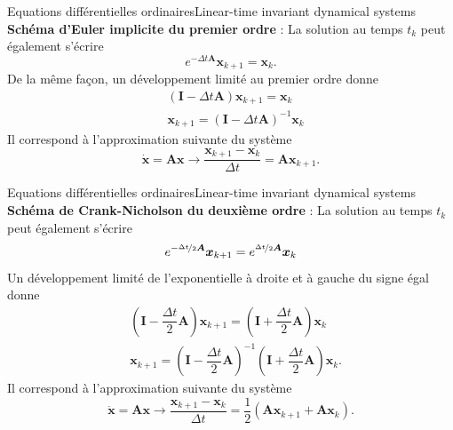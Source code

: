 \documentclass[usenames,dvipsnames,svgnames,10pt,aspectratio=169]{beamer}
\begin{document}
\begin{frame}[t, c]{Equations différentielles ordinaires}{Linear-time invariant dynamical systems}
  \alert{\textbf{Schéma d'Euler implicite du premier ordre}} : La solution au temps $t_k$ peut également s'écrire
    \[
    e^{-\Delta t \bm{A}} \bm{x}_{k+1} = \bm{x}_k.
    \]
    De la même façon, un développement limité au premier ordre donne
    \[
    \begin{aligned}
      & \left( \bm{I} - \Delta t \bm{A} \right) \bm{x}_{k+1} = \bm{x}_k \\
      & \bm{x}_{k+1} = \left( \bm{I} - \Delta t \bm{A} \right)^{-1} \bm{x}_k
    \end{aligned}
    \]
    Il correspond à l'approximation suivante du système
    \[
    \dot{\bm{x}} = \bm{Ax} \to \dfrac{\bm{x}_{k+1} - \bm{x}_k}{\Delta t} = \bm{Ax}_{k+1}.
    \]
\end{frame}

\begin{frame}[t, c]{Equations différentielles ordinaires}{Linear-time invariant dynamical systems}
  \alert{\textbf{Schéma de Crank-Nicholson du deuxième ordre}} : La solution au temps $t_k$ peut également s'écrire
  \[
  e^{-\nicefrac{\Delta t}{2} \bm{A}} \bm{x}_{k+1} = e^{\nicefrac{\Delta t}{2} \bm{A}} \bm{x}_{k}
  \]
  Un développement limité de l'exponentielle à droite et à gauche du signe égal donne
  \[
  \begin{aligned}
    & \left( \bm{I} - \dfrac{\Delta t}{2} \bm{A} \right) \bm{x}_{k+1} = \left( \bm{I} + \dfrac{\Delta t}{2} \bm{A} \right) \bm{x}_k \\
    & \bm{x}_{k+1} = \left( \bm{I} - \dfrac{\Delta t}{2} \bm{A} \right)^{-1} \left( \bm{I} + \dfrac{\Delta t}{2} \bm{A} \right) \bm{x}_k.
  \end{aligned}
  \]
  Il correspond à l'approximation suivante du système
  \[
  \dot{\bm{x}} = \bm{Ax} \to \dfrac{\bm{x}_{k+1} - \bm{x}_k}{\Delta t} = \dfrac{1}{2} \left( \bm{Ax}_{k+1} + \bm{Ax}_k \right).
  \]
\end{frame}
\end{document}
